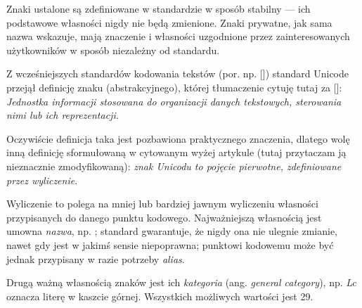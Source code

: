 Znaki ustalone są zdefiniowane w standardzie w sposób stabilny --- ich
podstawowe własności nigdy nie będą zmienione. Znaki prywatne, jak
sama nazwa wskazuje, mają znaczenie i własności uzgodnione przez
zainteresowanych użytkowników w sposób niezależny od standardu.


Z wcześniejszych standardów kodowania tekstów
(por. np. [\cite{bc286}]) standard Unicode przejął definicję znaku
(abstrakcyjnego), której tłumaczenie cytuję tutaj za [\cite{bc114}]:
\textit{Jednostka informacji stosowana do organizacji danych tekstowych,
  sterowania nimi lub ich reprezentacji.}



Oczywiście definicja taka jest pozbawiona praktycznego znaczenia,
dlatego wolę inną definicję sformułowaną w cytowanym wyżej artykule
(tutaj przytaczam ją nieznacznie zmodyfikowaną): \textit{znak Unicodu
  to pojęcie pierwotne, zdefiniowane przez wyliczenie}.


Wyliczenie to polega na mniej lub bardziej jawnym wyliczeniu własności
przypisanych do danego punktu kodowego. Najważniejszą własnością jest
umowna \textit{nazwa}, np. ;
standard gwarantuje, że nigdy ona nie ulegnie zmianie, nawet gdy jest
w jakimś sensie niepoprawna; punktowi kodowemu może być jednak
przypisany w razie potrzeby \textit{alias}.


Drugą ważną własnością znaków jest ich \textit{kategoria}
(ang. \textit{general category}), np. \textit{Lc} oznacza literę w kaszcie
górnej. Wszystkich możliwych wartości jest 29.

